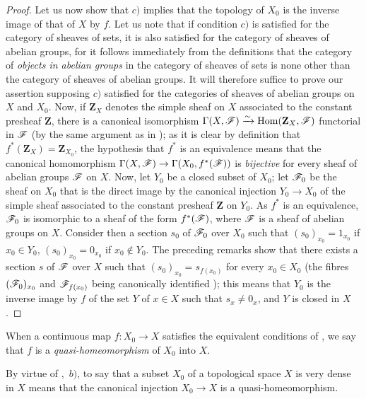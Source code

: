 \begin{proof}
Let us now show that $c)$ implies that the topology of $X_0$ is the inverse image of that of $X$ by $f$.
Let us note that if condition $c)$ is satisfied for the category of sheaves of sets, it is also satisfied for the category of sheaves of abelian groups, for it follows immediately from the definitions  that the category of \emph{objects in abelian groups} in the category of sheaves of sets is none other than the category of sheaves of abelian groups.
It will therefore suffice to prove our assertion supposing $c)$ satisfied for the categories of sheaves of abelian groups on $X$ and $X_0$.
Now, if $\mathbf{Z}_X$ denotes the simple sheaf on $X$ associated to the constant presheaf $\mathbf{Z}$, there is a canonical isomorphism $\Gamma(X,\mathscr{F})\xrightarrow{\sim}\operatorname{Hom}(\mathbf{Z}_X,\mathscr{F})$ functorial in $\mathscr{F}$ (by the same argument as in ); as it is clear by definition  that $f^*(\mathbf{Z}_X)=\mathbf{Z}_{X_0}$, the hypothesis that $f^*$ is an equivalence means that the canonical homomorphism $\Gamma(X,\mathscr{F})\to\Gamma(X_0,f^*(\mathscr{F}))$ is \emph{bijective} for every sheaf of abelian groups $\mathscr{F}$ on $X$.
Now, let $Y_0$ be a closed subset of $X_0$; let $\mathscr{F}_0$ be the sheaf on $X_0$ that is the direct image by the canonical injection $Y_0\to X_0$ of the simple sheaf associated to the constant presheaf $\mathbf{Z}$ on $Y_0$.
As $f^*$ is an equivalence, $\mathscr{F}_0$ is isomorphic to a sheaf of the form $f^*(\mathscr{F})$, where $\mathscr{F}$ is a sheaf of abelian groups on $X$.
Consider then a section $s_0$ of $\mathscr{F}_0$ over $X_0$ such that $(s_0)_{x_0}=1_{x_0}$ if $x_0\in Y_0$, $(s_0)_{x_0}=0_{x_0}$ if $x_0\notin Y_0$.
The preceding remarks show that there exists a section $s$ of $\mathscr{F}$ over $X$ such that $(s_0)_{x_0}=s_{f(x_0)}$ for every $x_0\in X_0$ (the fibres $(\mathscr{F}_0)_{x_0}$ and $\mathscr{F}_{f(x_0)}$ being canonically identified ); this means that $Y_0$ is the inverse image by $f$ of the set $Y$ of $x\in X$ such that $s_x\neq 0_x$, and $Y$ is closed in $X$.
\end{proof}

\begin{definition}[10.2.2]
\label{IV.10.2.2}
When a continuous map $f:X_0\to X$ satisfies the equivalent conditions of , we say that $f$ is a \emph{quasi-homeomorphism} of $X_0$ into $X$.
\end{definition}

By virtue of ,~$b)$, to say that a subset $X_0$ of a topological space $X$ is very dense in $X$ means that the canonical injection $X_0\to X$ is a quasi-homeomorphism.


